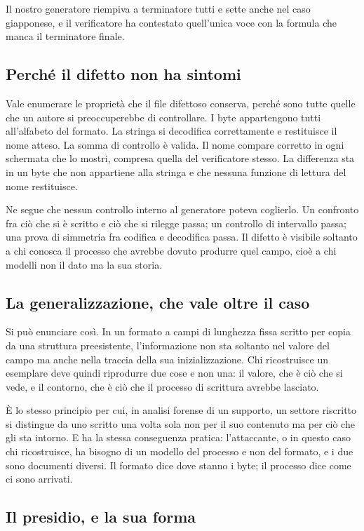 Il nostro generatore riempiva a terminatore tutti e sette anche nel caso giapponese, e il verificatore ha contestato quell'unica voce con la formula che manca il terminatore finale.

\subsection{Perché il difetto non ha sintomi}

Vale enumerare le proprietà che il file difettoso conserva, perché sono tutte quelle che un autore si preoccuperebbe di controllare. I byte appartengono tutti all'alfabeto del formato. La stringa si decodifica correttamente e restituisce il nome atteso. La somma di controllo è valida. Il nome compare corretto in ogni schermata che lo mostri, compresa quella del verificatore stesso. La differenza sta in un byte che non appartiene alla stringa e che nessuna funzione di lettura del nome restituisce.

Ne segue che nessun controllo interno al generatore poteva coglierlo. Un confronto fra ciò che si è scritto e ciò che si rilegge passa; un controllo di intervallo passa; una prova di simmetria fra codifica e decodifica passa. Il difetto è visibile soltanto a chi conosca il processo che avrebbe dovuto produrre quel campo, cioè a chi modelli non il dato ma la sua storia.

\subsection{La generalizzazione, che vale oltre il caso}

Si può enunciare così. In un formato a campi di lunghezza fissa scritto per copia da una struttura preesistente, l'informazione non sta soltanto nel valore del campo ma anche nella traccia della sua inizializzazione. Chi ricostruisce un esemplare deve quindi riprodurre due cose e non una: il valore, che è ciò che si vede, e il contorno, che è ciò che il processo di scrittura avrebbe lasciato.

È lo stesso principio per cui, in analisi forense di un supporto, un settore riscritto si distingue da uno scritto una volta sola non per il suo contenuto ma per ciò che gli sta intorno. E ha la stessa conseguenza pratica: l'attaccante, o in questo caso chi ricostruisce, ha bisogno di un modello del processo e non del formato, e i due sono documenti diversi. Il formato dice dove stanno i byte; il processo dice come ci sono arrivati.

\subsection{Il presidio, e la sua forma}

